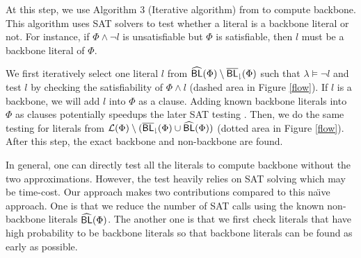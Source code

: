 \medskip
{}
At this step, we use Algorithm 3 (Iterative algorithm) from \cite{JLM15} to compute backbone.
This algorithm uses SAT solvers to test whether a literal is a backbone literal or not.
For instance, if $\Phi\wedge \neg l$ is unsatisfiable but $\Phi$ is satisfiable, then $l$ must be a backbone literal of $\Phi$.

We first iteratively select one literal $l$ from ${\sf \widehat{BL}}(\Phi)\setminus {\sf \overline{BL}_\downharpoonright}(\Phi)$ such that $\lambda \models \neg l$ and test $l$ by checking the satisfiability of $\Phi\wedge l$ (dashed area in Figure \ref{flow}).
If $l$ is a backbone, we will add $l$ into $\Phi$ as a clause. Adding known backbone literals into $\Phi$ as clauses potentially speedups the later SAT testing \cite{JLM15,MPA2015}.
Then, we do the same testing for literals from $\Lit(\Phi)\setminus (\NBLap(\Phi)\cup\BLap(\Phi))$ (dotted area in Figure \ref{flow}).
After this step, the exact backbone and non-backbone are found.


In general, one can directly test all the literals to compute backbone without the two approximations.
However, the test heavily relies on SAT solving which may be time-cost.
Our approach makes two contributions compared to this na\"{\i}ve approach.
One is that we reduce the number of SAT calls using the known non-backbone literals ${\sf \widehat{BL}}(\Phi)$.
The another one is that we first check literals that have high probability to be backbone literals so that backbone literals can be found as early as possible.


